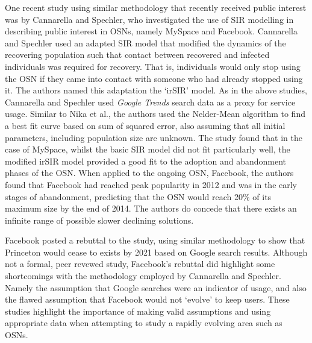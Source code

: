 One recent study using similar methodology that recently received public interest was by Cannarella and Spechler, who investigated the use of SIR modelling in describing public interest in OSNs, namely MySpace and Facebook.\cite{cannarella} Cannarella and Spechler used an adapted SIR model that modified the dynamics of the recovering population such that contact between recovered and infected individuals was required for recovery.  That is, individuals would only stop using the OSN if they came into contact with someone who had already stopped using it. The authors named this adaptation the `irSIR' model. As in the above studies, Cannarella and Spechler used \emph{Google Trends} search data as a proxy for service usage. Similar to Nika et al., the authors used the Nelder-Mean algorithm to find a best fit curve based on sum of squared error, also assuming that all initial parameters, including population size are unknown. The study found that in the case of MySpace, whilst the basic SIR model did not fit particularly well, the modified irSIR model provided a good fit to the adoption and abandonment phases of the OSN. When applied to the ongoing OSN, Facebook, the authors found that Facebook had reached peak popularity in 2012 and was in the early stages of abandonment, predicting that the OSN would reach 20\% of its maximum size by the end of 2014. The authors do concede that there exists an infinite range of possible slower declining solutions. 

Facebook posted a rebuttal to the study, using similar methodology to show that Princeton would cease to exists by 2021 based on Google search results.\cite{facebook} Although not a formal, peer revewed study, Facebook's rebuttal did highlight some shortcomings with the methodology employed by Cannarella and Spechler. Namely the assumption that Google searches were an indicator of usage, and also the flawed assumption that Facebook would not `evolve' to keep users. These studies highlight the importance of making valid assumptions and using appropriate data when attempting to study a rapidly evolving area such as OSNs.

